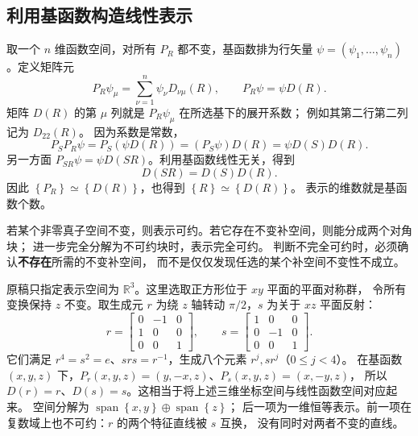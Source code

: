 \subsection{利用基函数构造线性表示}
取一个 $n$ 维函数空间，对所有 $P_R$ 都不变，基函数排为行矢量
$\psi=\left(\psi_1,\ldots,\psi_n\right)$。定义矩阵元
\begin{equation}
P_R\psi_\mu=\sum_{\nu=1}^{n}\psi_\nu D_{\nu\mu}\left(R\right),\qquad
P_R\psi=\psi D\left(R\right).
\end{equation}
矩阵 $D\left(R\right)$ 的第 $\mu$ 列就是 $P_R\psi_\mu$ 在所选基下的展开系数；
例如其第二行第二列记为 $D_{22}\left(R\right)$。
因为系数是常数，
\begin{equation}
P_SP_R\psi=P_S\left(\psi D\left(R\right)\right)=\left(P_S\psi\right)D\left(R\right)=\psi D\left(S\right)D\left(R\right).
\end{equation}
另一方面 $P_{SR}\psi=\psi D\left(SR\right)$。利用基函数线性无关，得到
\begin{equation}
D\left(SR\right)=D\left(S\right)D\left(R\right).
\end{equation}
因此 $\left\{P_R\right\}\simeq\left\{D\left(R\right)\right\}$，也得到 $\left\{R\right\}\simeq\left\{D\left(R\right)\right\}$。
表示的维数就是基函数个数。

若某个非零真子空间不变，则表示可约。若它存在不变补空间，则能分成两个对角块；
进一步完全分解为不可约块时，表示完全可约。
判断不完全可约时，必须确认\textbf{不存在}所需的不变补空间，
而不是仅仅发现任选的某个补空间不变性不成立。

\begin{example}
原稿只指定表示空间为 $\mathbb{R}^3$。这里选取正方形位于 $xy$ 平面的平面对称群，
令所有变换保持 $z$ 不变。取生成元 $r$ 为绕 $z$ 轴转动 $\pi/2$，$s$ 为关于 $xz$ 平面反射：
\begin{equation}
r=\begin{bmatrix}0&-1&0\\1&0&0\\0&0&1\end{bmatrix},\qquad
s=\begin{bmatrix}1&0&0\\0&-1&0\\0&0&1\end{bmatrix}.
\end{equation}
它们满足 $r^4=s^2=e$、$srs=r^{-1}$，生成八个元素 $r^j,sr^j$（$0\leqslant j<4$）。
在基函数 $\left(x,y,z\right)$ 下，$P_r\left(x,y,z\right)=\left(y,-x,z\right)$、$P_s\left(x,y,z\right)=\left(x,-y,z\right)$，
所以 $D\left(r\right)=r$、$D\left(s\right)=s$。这相当于将上述三维坐标空间与线性函数空间对应起来。
空间分解为 $\operatorname{span}\left\{x,y\right\}\oplus\operatorname{span}\left\{z\right\}$；
后一项为一维恒等表示。前一项在复数域上也不可约：$r$ 的两个特征直线被 $s$ 互换，
没有同时对两者不变的直线。
\end{example}

